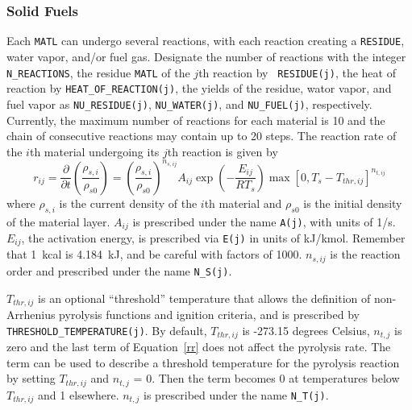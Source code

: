 \documentclass[11pt]{book}
\newcommand{\ct}{\tt\small}
\newcommand{\dod}[2]{\frac{\partial #1}{\partial #2}}
\newcommand{\be}{\begin{equation}}
\newcommand{\ee}{\end{equation}}
\begin{document}
\subsubsection{Solid Fuels}

Each {\ct MATL} can undergo several reactions, with each
reaction creating a {\ct RESIDUE}, water vapor, and/or fuel
gas. Designate the number of reactions with the integer {\ct
N\_REACTIONS}, the residue {\ct MATL} of the $j$th reaction by {\ct
RESIDUE(j)}, the heat of reaction by {\ct HEAT\_OF\_REACTION(j)}, the
yields of the residue, wator vapor, and fuel vapor as
{\ct NU\_RESIDUE(j)}, {\ct NU\_WATER(j)}, and {\ct NU\_FUEL(j)},
respectively. Currently, the maximum number of reactions for each
material is 10 and the chain of consecutive reactions may contain up
to 20 steps. The reaction rate of the $i$th material undergoing its
$j$th reaction is given by
\be
  r_{ij} =
  \dod{ }{t} \left( \frac{\rho_{s,i}}{\rho_{s0}} \right) =
  \left(\frac{\rho_{s,i}}{\rho_{s0}} \right)^{n_{s,ij}}
  A_{ij} \exp\left(-\frac{E_{ij}}{RT_s} \right)
  \max\left[0,T_s-T_{thr,ij}\right]^{n_{t,ij}}  \label{rr}
\ee
where $\rho_{s,i}$ is the current density of the $i$th material and
$\rho_{s0}$ is the initial density of the material layer.
$A_{ij}$ is prescribed under the name {\ct A(j)}, with units of
1/s. $E_{ij}$, the activation energy, is prescribed via {\ct E(j)} in
units of kJ/kmol. Remember that 1~kcal is 4.184~kJ, and be careful
with factors of 1000. $n_{s,ij}$ is the reaction order and prescribed under the name
{\ct N\_S(j)}.

$T_{thr,ij}$ is an optional ``threshold'' temperature that
allows the definition of non-Arrhenius pyrolysis functions and
ignition criteria, and is prescribed by {\ct THRESHOLD\_TEMPERATURE(j)}.
By default, $T_{thr,ij}$ is -273.15 degrees Celsius, $n_{t,j}$ is zero
and the last term of Equation~\ref{rr} does not affect the pyrolysis rate.
The term can be used to describe a threshold temperature for the pyrolysis
reaction by setting $T_{thr,ij}$ and $n_{t,j}$ = 0. Then the term
becomes 0 at temperatures below $T_{thr,ij}$ and 1 elsewhere.
$n_{t,j}$ is prescribed under the name {\ct N\_T(j)}.
\end{document}
